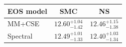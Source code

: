 \renewcommand{\arraystretch}{1.4}
\begin{tabular}{lcc}
    \hline
    EOS model & SMC & NS \\
    \hline
    MM+CSE & $12.60^{+1.04}_{-1.42}$ & $12.46^{+1.15}_{-1.38}$ \\
    Spectral & $12.49^{+1.01}_{-1.33}$ & $12.40^{+1.03}_{-1.34}$ \\
    \hline
\end{tabular}
